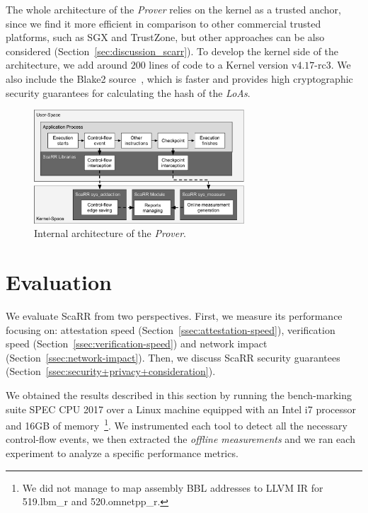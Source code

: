 The whole architecture of the \emph{Prover} relies on the kernel as a trusted 
anchor, since we find it more efficient in comparison to other commercial 
trusted platforms, such as SGX and TrustZone, but other approaches can be also 
considered (Section~\ref{sec:discussion_scarr}). To develop the kernel side of 
the 
architecture, we add around $200$ lines of code to a Kernel version 
v$4.17$-rc$3$.
We also include the Blake2 source~\citep{Aumasson2014,blake2}, which is faster 
and provides high cryptographic security guarantees for calculating the hash of 
the \emph{LoAs}.
\begin{figure}[t]
	\centering
	\includegraphics[width=0.7\textwidth]{fig_c4/architecture.pdf}
	\caption{Internal architecture of the \emph{Prover}.}
	\label{fig:architecture_scarr}
\end{figure}

\section{Evaluation}
\label{sec:evaluation_scarr_scarr}
We evaluate ScaRR from two perspectives.
First, we measure its performance focusing on: attestation speed 
(Section~\ref{ssec:attestation-speed}), verification speed 
(Section~\ref{ssec:verification-speed}) and network impact 
(Section~\ref{ssec:network-impact}).
Then, we discuss ScaRR security guarantees 
(Section~\ref{ssec:security+privacy+consideration}). 

We obtained the results described in this section by running the bench-marking 
suite SPEC CPU 2017 over a Linux machine
equipped with an Intel i7 processor and 16GB of memory~\footnote{We did not 
manage to map assembly BBL addresses to LLVM IR for 519.lbm\_r and 
520.omnetpp\_r.}.
We instrumented each tool to detect all the necessary control-flow events, we 
then extracted the \emph{offline measurements} and we ran each experiment to 
analyze a specific performance metrics. 

